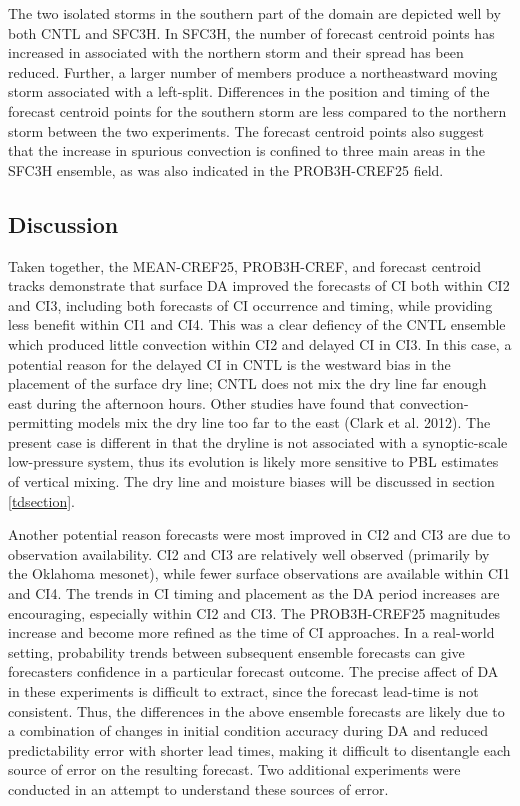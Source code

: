 The two isolated storms in the southern part of the domain are depicted well by both CNTL and SFC3H. In SFC3H, the number of forecast centroid points has increased in associated with the northern storm and their spread has been reduced. Further, a larger number of members produce a northeastward moving storm associated with a left-split. Differences in the position and timing of the forecast centroid points for the southern storm are less compared to the northern storm between the two experiments. The forecast centroid points also suggest that the increase in spurious convection is confined to three main areas in the SFC3H ensemble, as was also indicated in the PROB3H-CREF25 field.

\subsection{Discussion} 
\label{sfcDA_diss}
Taken together, the MEAN-CREF25, PROB3H-CREF, and forecast centroid tracks demonstrate that surface DA improved the forecasts of CI both within CI2 and CI3, including both forecasts of CI occurrence and timing, while providing less benefit within CI1 and CI4. This was a clear defiency of the CNTL ensemble which produced little convection within CI2 and delayed CI in CI3. In this case, a potential reason for the delayed CI in CNTL is the westward bias in the placement of the surface dry line; CNTL does not mix the dry line far enough east during the afternoon hours. Other studies have found that convection-permitting models mix the dry line too far to the east (Clark et al. 2012). The present case is different in that the dryline is not associated with a synoptic-scale low-pressure system, thus its evolution is likely more sensitive to PBL estimates of vertical mixing. The dry line and moisture biases will be discussed in section \ref{tdsection}.

Another potential reason forecasts were most improved in CI2 and CI3 are due to observation availability. CI2 and CI3 are relatively well observed (primarily by the Oklahoma mesonet), while fewer surface observations are available within CI1 and CI4. The trends in CI timing and placement as the DA period increases are encouraging, especially within CI2 and CI3. The PROB3H-CREF25 magnitudes increase and become more refined as the time of CI approaches. In a real-world setting, probability trends between subsequent ensemble forecasts can give forecasters confidence in a particular forecast outcome. The precise affect of DA in these experiments is difficult to extract, since the forecast lead-time is not consistent. Thus, the differences in the above ensemble forecasts are likely due to a combination of changes in initial condition accuracy during DA and reduced predictability error with shorter lead times, making it difficult to disentangle each source of error on the resulting forecast. Two additional experiments were conducted in an attempt to understand these sources of error.

